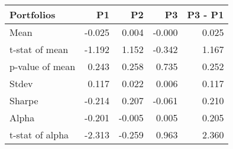 \begin{tabular}{lrrrr}
\toprule
Portfolios & P1 & P2 & P3 & P3 - P1 \\
\midrule
Mean & -0.025 & 0.004 & -0.000 & 0.025 \\
t-stat of mean & -1.192 & 1.152 & -0.342 & 1.167 \\
p-value of mean & 0.243 & 0.258 & 0.735 & 0.252 \\
Stdev & 0.117 & 0.022 & 0.006 & 0.117 \\
Sharpe & -0.214 & 0.207 & -0.061 & 0.210 \\
Alpha & -0.201 & -0.005 & 0.005 & 0.205 \\
t-stat of alpha & -2.313 & -0.259 & 0.963 & 2.360 \\
\bottomrule
\end{tabular}
